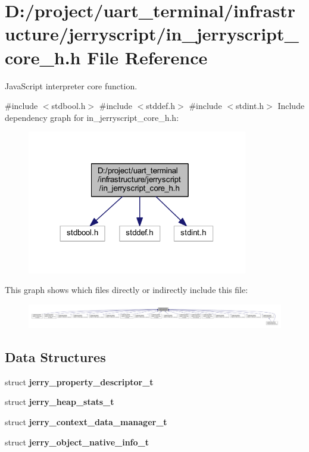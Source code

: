 \section{D\+:/project/uart\+\_\+terminal/infrastructure/jerryscript/in\+\_\+jerryscript\+\_\+core\+\_\+h.h File Reference}
\label{in__jerryscript__core__h_8h}


Java\+Script interpreter core function.  


{\ttfamily \#include $<$stdbool.\+h$>$}\newline
{\ttfamily \#include $<$stddef.\+h$>$}\newline
{\ttfamily \#include $<$stdint.\+h$>$}\newline
Include dependency graph for in\+\_\+jerryscript\+\_\+core\+\_\+h.\+h\+:
\nopagebreak
\begin{figure}[H]
\begin{center}
\leavevmode
\includegraphics[width=273pt]{in__jerryscript__core__h_8h__incl}
\end{center}
\end{figure}
This graph shows which files directly or indirectly include this file\+:
\nopagebreak
\begin{figure}[H]
\begin{center}
\leavevmode
\includegraphics[width=350pt]{in__jerryscript__core__h_8h__dep__incl}
\end{center}
\end{figure}
\subsection*{Data Structures}
\begin{DoxyCompactItemize}
\item 
struct \textbf{ jerry\+\_\+property\+\_\+descriptor\+\_\+t}
\item 
struct \textbf{ jerry\+\_\+heap\+\_\+stats\+\_\+t}
\item 
struct \textbf{ jerry\+\_\+context\+\_\+data\+\_\+manager\+\_\+t}
\item 
struct \textbf{ jerry\+\_\+object\+\_\+native\+\_\+info\+\_\+t}
\end{DoxyCompactItemize}
